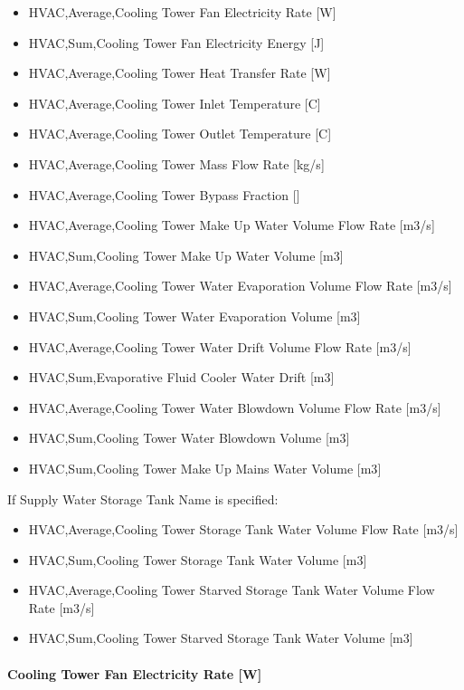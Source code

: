 \begin{itemize}
\item
  HVAC,Average,Cooling Tower Fan Electricity Rate {[}W{]}
\item
  HVAC,Sum,Cooling Tower Fan Electricity Energy {[}J{]}
\item
  HVAC,Average,Cooling Tower Heat Transfer Rate {[}W{]}
\item
  HVAC,Average,Cooling Tower Inlet Temperature {[}C{]}
\item
  HVAC,Average,Cooling Tower Outlet Temperature {[}C{]}
\item
  HVAC,Average,Cooling Tower Mass Flow Rate {[}kg/s{]}
\item
  HVAC,Average,Cooling Tower Bypass Fraction {[]}
\item
  HVAC,Average,Cooling Tower Make Up Water Volume Flow Rate {[}m3/s{]}
\item
  HVAC,Sum,Cooling Tower Make Up Water Volume {[}m3{]}
\item
  HVAC,Average,Cooling Tower Water Evaporation Volume Flow Rate {[}m3/s{]}
\item
  HVAC,Sum,Cooling Tower Water Evaporation Volume {[}m3{]}
\item
  HVAC,Average,Cooling Tower Water Drift Volume Flow Rate {[}m3/s{]}
\item
  HVAC,Sum,Evaporative Fluid Cooler Water Drift {[}m3{]}
\item
  HVAC,Average,Cooling Tower Water Blowdown Volume Flow Rate {[}m3/s{]}
\item
  HVAC,Sum,Cooling Tower Water Blowdown Volume {[}m3{]}
\item
  HVAC,Sum,Cooling Tower Make Up Mains Water Volume {[}m3{]}
\end{itemize}

If Supply Water Storage Tank Name is specified:

\begin{itemize}
\item
  HVAC,Average,Cooling Tower Storage Tank Water Volume Flow Rate {[}m3/s{]}
\item
  HVAC,Sum,Cooling Tower Storage Tank Water Volume {[}m3{]}
\item
  HVAC,Average,Cooling Tower Starved Storage Tank Water Volume Flow Rate {[}m3/s{]}
\item
  HVAC,Sum,Cooling Tower Starved Storage Tank Water Volume {[}m3{]}
\end{itemize}

\paragraph{Cooling Tower Fan Electricity Rate {[}W{]}}\label{cooling-tower-fan-electric-power-w-4}

